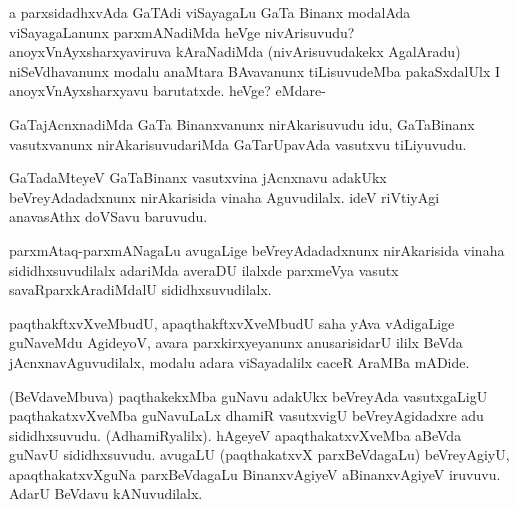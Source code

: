
\begin{artha}
a parxsidadhxvAda GaTAdi viSayagaLu GaTa Binanx modalAda viSayagaLanunx parxmANadiMda heVge nivArisuvudu? anoyxVnAyxsharxyaviruva kAraNadiMda (nivArisuvudakekx AgalAradu) niSeVdhavanunx modalu anaMtara BAvavanunx tiLisuvudeMba pakaSxdalUlx I anoyxVnAyxsharxyavu barutatxde. heVge? eMdare-
\end{artha}

\begin{artha}
GaTajAcnxnadiMda GaTa Binanxvanunx nirAkarisuvudu idu, GaTaBinanx vasutxvanunx nirAkarisuvudariMda GaTarUpavAda vasutxvu tiLiyuvudu.
\end{artha}


\begin{artha}
GaTadaMteyeV GaTaBinanx vasutxvina jAcnxnavu adakUkx beVreyAdadadxnunx nirAkarisida vinaha Aguvudilalx. ideV riVtiyAgi anavasAthx doVSavu baruvudu.
\end{artha}


\begin{artha}
parxmAtaq-parxmANagaLu avugaLige beVreyAdadadxnunx nirAkarisida vinaha sididhxsuvudilalx adariMda averaDU ilalxde parxmeVya vasutx savaRparxkAradiMdalU sididhxsuvudilalx.
\end{artha}


\begin{artha}
paqthakftxvXveMbudU, apaqthakftxvXveMbudU saha yAva vAdigaLige guNaveMdu AgideyoV, avara parxkirxyeyanunx anusarisidarU ililx BeVda jAcnxnavAguvudilalx, modalu adara viSayadalilx caceR AraMBa mADide.
\end{artha}

\begin{artha}
(BeVdaveMbuva) paqthakekxMba guNavu adakUkx beVreyAda vasutxgaLigU paqthakatxvXveMba guNavuLaLx dhamiR vasutxvigU beVreyAgidadxre adu sididhxsuvudu. (AdhamiRyalilx). hAgeyeV apaqthakatxvXveMba aBeVda guNavU sididhxsuvudu. avugaLU (paqthakatxvX parxBeVdagaLu) beVreyAgiyU, apaqthakatxvXguNa parxBeVdagaLu BinanxvAgiyeV aBinanxvAgiyeV iruvuvu. AdarU BeVdavu kANuvudilalx.
\end{artha}

